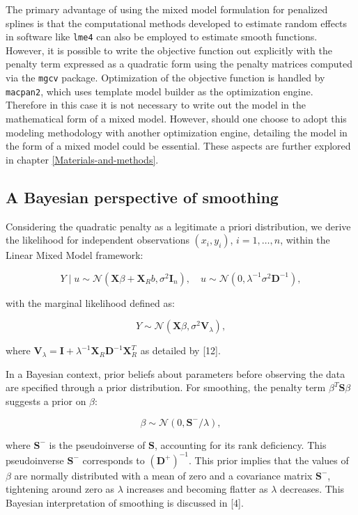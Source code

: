 \documentclass[
11pt, %
oneside, %
english, %
singlespacing, %
]{macthesis} %
\begin{document}
The primary advantage of using the mixed model formulation for penalized splines is that the computational methods developed to estimate random effects in software like \texttt{lme4} can also be employed to estimate smooth functions. However, it is possible to write the objective function out explicitly with the penalty term expressed as a quadratic form using the penalty matrices computed via the \texttt{mgcv} package. Optimization of the objective function is handled by \texttt{macpan2}, which uses template model builder as the optimization engine. Therefore in this case it is not necessary to write out the model in the mathematical form of a mixed model. However, should one choose to adopt this modeling methodology with another optimization engine, detailing the model in the form of a mixed model could be essential. These aspects are further explored in chapter \ref{Materials-and-methods}.

\subsection{A Bayesian perspective of smoothing}\label{A-Bayesian-perspective-of-smoothing}

Considering the quadratic penalty as a legitimate a priori distribution, we derive the likelihood for independent observations \((x_i, y_i)\), \(i = 1, \dots, n\), within the Linear Mixed Model framework:

\[
Y \mid u \sim \mathcal{N}(\mathbf{X}\beta + \mathbf{X}_Rb, \sigma^2 \mathbf{I}_n), \quad u \sim \mathcal{N}(0, \lambda^{-1}\sigma^2 \mathbf{D}^{-1}),
\]

with the marginal likelihood defined as:

\[
Y \sim \mathcal{N}(\mathbf{X}\beta, \sigma^2 \mathbf{V}_{\lambda}),
\]

where \(\mathbf{V}_{\lambda} = \mathbf{I} + \lambda^{-1} \mathbf{X}_R \mathbf{D}^{-1} \mathbf{X}_R^T\) as detailed by {[}12{]}.

In a Bayesian context, prior beliefs about parameters before observing the data are specified through a prior distribution. For smoothing, the penalty term \(\beta^T \mathbf{S} \beta\) suggests a prior on \(\beta\):

\[
\beta \sim \mathcal{N}(0, \mathbf{S}^{-}/\lambda),
\label{eq:penalty prior}
\]

where \(\mathbf{S}^{-}\) is the pseudoinverse of \(\mathbf{S}\), accounting for its rank deficiency. This pseudoinverse \(\mathbf{S}^{-}\) corresponds to \((\mathbf{D}^+)^{-1}\). This prior implies that the values of \(\beta\) are normally distributed with a mean of zero and a covariance matrix \(\mathbf{S}^{-}\), tightening around zero as \(\lambda\) increases and becoming flatter as \(\lambda\) decreases. This Bayesian interpretation of smoothing is discussed in {[}4{]}.
\end{document}
